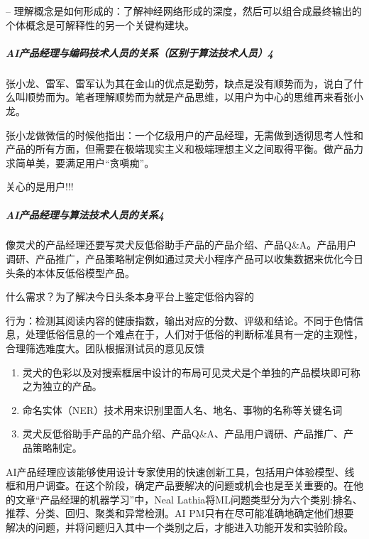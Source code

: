 \documentclass[letterpaper,11pt,english]{sphinxmanual}
\begin{document}
–
理解概念是如何形成的：了解神经网络形成的深度，然后可以组合成最终输出的个体概念是可解释性的另一个关键构建块。


\subparagraph{AI产品经理与编码技术人员的关系（区别于算法技术人员）4\sphinxfootnotemark[88]}
\label{\detokenize{chapter_introduction/AI_PM:ai-4}}%
\begin{footnotetext}[88]\sphinxAtStartFootnote
{}
%
\end{footnotetext}\ignorespaces 
张小龙、雷军、雷军认为其在金山的优点是勤劳，缺点是没有顺势而为，说白了什么叫顺势而为。笔者理解顺势而为就是产品思维，以用户为中心的思维再来看张小龙。

张小龙做微信的时候他指出：一个亿级用户的产品经理，无需做到透彻思考人性和产品的所有方面，但需要在极端现实主义和极端理想主义之间取得平衡。做产品力求简单美，要满足用户“贪嗔痴”。

关心的是用户!!!


\subparagraph{AI产品经理与算法技术人员的关系4\sphinxfootnotemark[89]}
\label{\detokenize{chapter_introduction/AI_PM:ai4}}%
\begin{footnotetext}[89]\sphinxAtStartFootnote
{}
%
\end{footnotetext}\ignorespaces 
像灵犬的产品经理还要写灵犬反低俗助手产品的产品介绍、产品Q\&A。产品用户调研、产品推广，产品策略制定例如通过灵犬小程序产品可以收集数据来优化今日头条的本体反低俗模型产品。

什么需求？为了解决今日头条本身平台上鉴定低俗内容的

行为：检测其阅读内容的健康指数，输出对应的分数、评级和结论。不同于色情信息，处理低俗信息的一个难点在于，人们对于低俗的判断标准具有一定的主观性，合理筛选难度大。团队根据测试员的意见反馈
\begin{enumerate}
%
\item {} 
灵犬的色彩以及对搜索框居中设计的布局可见灵犬是个单独的产品模块即可称之为独立的产品。

\item {} 
命名实体（NER）技术用来识别里面人名、地名、事物的名称等关键名词

\item {} 
灵犬反低俗助手产品的产品介绍、产品Q\&A、产品用户调研、产品推广、产品策略制定。

\end{enumerate}

AI产品经理应该能够使用设计专家使用的快速创新工具，包括用户体验模型、线框和用户调查。在这个阶段，确定产品要解决的问题或机会也是至关重要的。在他的文章“产品经理的机器学习”中，Neal
Lathia将ML问题类型分为六个类别:排名、推荐、分类、回归、聚类和异常检测。AI
PM只有在尽可能准确地确定他们想要解决的问题，并将问题归入其中一个类别之后，才能进入功能开发和实验阶段。%
\begin{footnote}[90]\sphinxAtStartFootnote
{}
%
\end{footnote}
\end{document}
